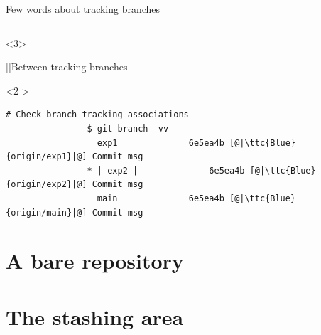\documentclass[usenames,svgnames,14pt]{beamer}
\newcommand{\ttc}[2]{\texttt{\textcolor{#1}{#2}}}%
\begin{document}
\begin{frame}[fragile]{Few words about tracking branches}
\begin{overlayarea}{\textwidth}{0.85\textheight}
\begin{overlayarea}{\textwidth}{0.35\textheight}
\begin{onlyenv}
\begin{lstlisting}[style=MyBash, xrightmargin=-1mm, xleftmargin=-1mm]
                \end{lstlisting}
            \end{onlyenv}
            \begin{onlyenv}<3>
                \begin{varblock}{}[\textwidth]{Between tracking branches}
                \end{varblock}
            \end{onlyenv}
        \end{overlayarea}
        \begin{onlyenv}<2->
            \vspace{-5pt}
            \begin{lstlisting}[style=MyBash, xrightmargin=-1mm, xleftmargin=-1mm]
                # Check branch tracking associations
                $ git branch -vv
                  exp1              6e5ea4b [@|\ttc{Blue}{origin/exp1}|@] Commit msg
                * |-exp2-|              6e5ea4b [@|\ttc{Blue}{origin/exp2}|@] Commit msg
                  main              6e5ea4b [@|\ttc{Blue}{origin/main}|@] Commit msg
            \end{lstlisting}
        \end{onlyenv}
    \end{overlayarea}
\end{frame}



\section{A bare repository}


\section{The stashing area}


\end{document}
